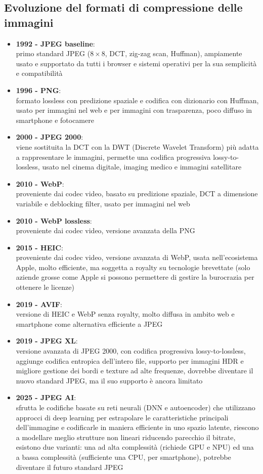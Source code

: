 \subsection{Evoluzione del formati di compressione delle immagini}
\begin{itemize}[itemsep=2pt]
	\item \textbf{1992 - JPEG baseline}: \\
	primo standard JPEG (\(8 \times 8\), DCT, zig-zag scan, Huffman), ampiamente usato e supportato da tutti i browser
	e sistemi operativi per la sua semplicità e compatibilità
	\item \textbf{1996 - PNG}: \\
	formato lossless con predizione spaziale e codifica con dizionario con Huffman, usato per immagini nel web e per
	immagini con trasparenza, poco diffuso in smartphone e fotocamere
	\item \textbf{2000 - JPEG 2000}: \\
	viene sostituita la DCT con la DWT (Discrete Wavelet Transform) più adatta a rappresentare le immagini, permette una
	codifica progressiva lossy-to-lossless, usato nel cinema digitale, imaging medico e immagini satellitare
	\item \textbf{2010 - WebP}: \\
	proveniente dai codec video, basato su predizione spaziale, DCT a dimensione variabile e deblocking filter, usato per
	immagini nel web
	\item \textbf{2010 - WebP lossless}: \\
	proveniente dai codec video, versione avanzata della PNG
	\item \textbf{2015 - HEIC}: \\
	proveniente dai codec video, versione avanzata di WebP, usata nell'ecosistema Apple, molto efficiente, ma soggetta
	a royalty su tecnologie brevettate (solo aziende grosse come Apple si possono permettere di gestire la burocrazia
	per ottenere le licenze)
	\item \textbf{2019 - AVIF}: \\
	versione di HEIC e WebP senza royalty, molto diffusa in ambito web e smartphone come alternativa efficiente a JPEG
	\item \textbf{2019 - JPEG XL}: \\
	versione avanzata di JPEG 2000, con codifica progressiva lossy-to-lossless, aggiunge codifica entropica dell'intero
	file, supporto per immagini HDR e migliore gestione dei bordi e texture ad alte frequenze, dovrebbe diventare il nuovo
	standard JPEG, ma il suo supporto è ancora limitato
	\item \textbf{2025 - JPEG AI}: \\
	sfrutta le codifiche basate su reti neurali (DNN e autoencoder) che utilizzano approcci di deep learning per estrapolare
	le caratteristiche principali dell'immagine e codificarle in maniera efficiente in uno spazio latente, riescono a
	modellare meglio strutture non lineari riducendo parecchio il bitrate, esistono due varianti: una ad alta complessità
	(richiede GPU e NPU) ed una a bassa complessità (sufficiente una CPU, per smartphone), potrebbe diventare il futuro
	standard JPEG
\end{itemize}
